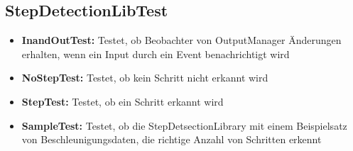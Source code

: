 \documentclass[../validierung.tex]{subfiles}
\begin{document}
\subsection{StepDetectionLibTest}
\begin{itemize}
\item \textbf{InandOutTest:} Testet, ob Beobachter von OutputManager Änderungen erhalten, wenn ein Input durch ein Event benachrichtigt wird
\item \textbf{NoStepTest:} Testet, ob kein Schritt nicht erkannt wird
\item \textbf{StepTest:} Testet, ob ein Schritt erkannt wird
\item \textbf{SampleTest:} Testet, ob die StepDetsectionLibrary mit einem Beispielsatz von Beschleunigungsdaten, die richtige Anzahl von Schritten erkennt
\end{itemize}
\end{document}
